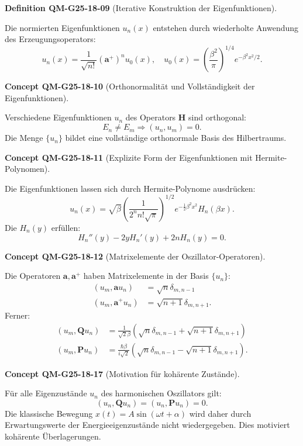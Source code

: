 \documentclass[10pt, letterpaper]{article}
\newcommand{\CustomHeading}[3]{%
  \par\medskip\noindent%
  \textbf{#1 #2} \textnormal{(#3)}.\enskip%
}
\newenvironment{DEF}[2]{\CustomHeading{Definition}{#1}{#2}}{}
\newenvironment{CONC}[2]{\CustomHeading{Concept}{#1}{#2}}{}
\begin{document}
\begin{DEF}{QM-G25-18-09}{Iterative Konstruktion der Eigenfunktionen}
Die normierten Eigenfunktionen $u_n(x)$ entstehen durch wiederholte Anwendung des Erzeugungsoperators:
\[
u_n(x) = \frac{1}{\sqrt{n!}} (\mathbf{a}^+)^n u_0(x), \quad u_0(x) = \left( \frac{\beta^2}{\pi} \right)^{1/4} e^{-\beta^2 x^2/2}.
\]
\end{DEF}

\begin{CONC}{QM-G25-18-10}{Orthonormalität und Vollständigkeit der Eigenfunktionen}
Verschiedene Eigenfunktionen $u_n$ des Operators $\mathbf{H}$ sind orthogonal:
\[
E_n \neq E_m \Rightarrow (u_n, u_m) = 0.
\]
Die Menge $\{u_n\}$ bildet eine vollständige orthonormale Basis des Hilbertraums.
\end{CONC}

\begin{CONC}{QM-G25-18-11}{Explizite Form der Eigenfunktionen mit Hermite-Polynomen}
Die Eigenfunktionen lassen sich durch Hermite-Polynome ausdrücken:
\[
u_n(x) = \sqrt{\beta} \left( \frac{1}{2^n n! \sqrt{\pi}} \right)^{1/2} e^{-\frac{1}{2} \beta^2 x^2} H_n(\beta x).
\]
Die $H_n(y)$ erfüllen:
\[
H_n''(y) - 2y H_n'(y) + 2n H_n(y) = 0.
\]
\end{CONC}

\begin{CONC}{QM-G25-18-12}{Matrixelemente der Oszillator-Operatoren}
Die Operatoren $\mathbf{a}, \mathbf{a}^+$ haben Matrixelemente in der Basis $\{u_n\}$:
\[
\begin{aligned}
(u_m, \mathbf{a} u_n) &= \sqrt{n} \delta_{m,n-1} \\
(u_m, \mathbf{a}^+ u_n) &= \sqrt{n+1} \delta_{m,n+1}.
\end{aligned}
\]
Ferner:
\[
\begin{aligned}
(u_m, \mathbf{Q} u_n) &= \frac{1}{\sqrt{2}\beta} \left( \sqrt{n} \delta_{m,n-1} + \sqrt{n+1} \delta_{m,n+1} \right) \\
(u_m, \mathbf{P} u_n) &= \frac{\hbar\beta}{i\sqrt{2}} \left( \sqrt{n} \delta_{m,n-1} - \sqrt{n+1} \delta_{m,n+1} \right).
\end{aligned}
\]
\end{CONC}

\begin{CONC}{QM-G25-18-17}{Motivation für kohärente Zustände}
Für alle Eigenzustände $u_n$ des harmonischen Oszillators gilt:
\[
(u_n, \mathbf{Q} u_n) = (u_n, \mathbf{P} u_n) = 0.
\]
Die klassische Bewegung $x(t) = A\sin(\omega t + \alpha)$ wird daher durch Erwartungswerte der Energieeigenzustände nicht wiedergegeben. Dies motiviert kohärente Überlagerungen.
\end{CONC}
\end{document}
